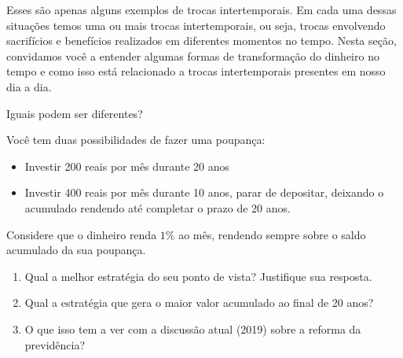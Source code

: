 Esses são apenas alguns exemplos de trocas intertemporais. Em cada uma dessas situações temos uma ou mais trocas intertemporais, ou seja, trocas envolvendo sacrifícios e benefícios realizados em diferentes momentos no tempo. Nesta seção, convidamos você a entender algumas formas de transformação do dinheiro no tempo e como isso está relacionado a trocas intertemporais presentes em nosso dia a dia.


\clearpage
\begin{task}{Iguais podem ser diferentes?}
\label{fin-ativ-12}

Você tem duas possibilidades de fazer uma poupança:

\begin{itemize}

\item Investir 200 reais por mês durante 20 anos

\item Investir 400 reais por mês durante 10 anos, parar de depositar, deixando o acumulado rendendo até completar o prazo de 20 anos.

\end{itemize}

Considere que o dinheiro renda $1$\% ao mês, rendendo sempre sobre o saldo acumulado da sua poupança. 

\begin{enumerate}

\item Qual a melhor estratégia do seu ponto de vista? Justifique sua resposta.

\item Qual a estratégia que gera o maior valor acumulado ao final de 20 anos?

\item O que isso tem a ver com a discussão atual (2019) sobre a reforma da previdência?
\end{enumerate}

\end{task}


